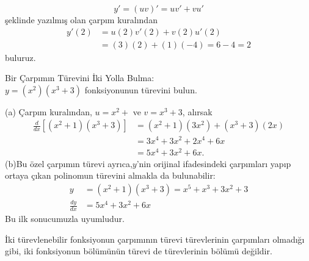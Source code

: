 \begin{cozum}
	\begin{equation*}
y' = (uv)' = uv'+vu'
	\end{equation*}
şeklinde yazılmış olan çarpım kuralından 
	\begin{equation*}
	\begin{split}
	y'(2) &=u(2)v'(2)+v(2)u'(2)\\
	&=(3)(2) + (1)(-4)=6-4=2
	\end{split}
	\end{equation*}
buluruz.
\end{cozum}
\begin{ornek} Bir Çarpımın Türevini İki Yolla Bulma:\\
$y=(x^2)(x^3+3)$ fonksiyonunun türevini bulun.
\end{ornek}
\begin{cozum}
	(a) Çarpım kuralından, $u=x^2+$ ve $v=x^3+3$, alırsak
	\begin{equation*}
	\begin{split}
	\frac{d}{dx}[(x^2+1)(x^3+3)]&=(x^2+1)(3x^2)+(x^3+3)(2x)\\
		&=3x^4+3x^2+2x^4+6x\\
		&=5x^4+3x^2+6x.
	\end{split}
	\end{equation*}
	(b)Bu özel çarpımın türevi ayrıca,$y$'nin orijinal ifadesindeki çarpımları yapıp ortaya çıkan polinomun türevini almakla da bulunabilir:
	\begin{equation*}
	\begin{split}
	y&=(x^2+1)(x^3+3)=x^5+x^3+3x^2+3\\
	\frac{dy}{dx}&=5x^4+3x^2+6x
	\end{split}
	\end{equation*}
Bu ilk sonucumuzla uyumludur.
\end{cozum}
İki türevlenebilir fonksiyonun çarpımının türevi türevlerinin çarpımları olmadığı gibi, iki fonksiyonun bölümünün türevi de türevlerinin bölümü değildir. \\



